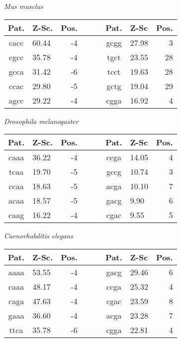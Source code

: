 \vspace{1em}
\noindent
{\it Mus musclus}

\noindent
\begin{center}
\begin{tabular}{clrcclr}
Pat. & Z-Sc. & Pos. & \verb+   + & Pat. & Z-Sc & Pos. \\
\hline
cacc & 60.44 & -4 & & gcgg & 27.98 & 3 \\
cgcc & 35.78 & -4 & & tgct & 23.55 & 28 \\
gcca & 31.42 & -6 & & tcct & 19.63 & 28 \\
ccac & 29.80 & -5 & & gctg & 19.04 & 29 \\
agcc & 29.22 & -4 & & cgga & 16.92 & 4 \\
\end{tabular}
\end{center}

\vspace{1em}
\noindent
{\it Drosophila melanogaster}

\noindent
\begin{center}
\begin{tabular}{clrcclr}
Pat. & Z-Sc. & Pos. & \verb+   + & Pat. & Z-Sc & Pos. \\
\hline
caaa & 36.22 & -4 & & ccga & 14.05 & 4 \\
tcaa & 19.70 & -5 & & gccg & 10.74 & 3 \\
ccaa & 18.63 & -5 & & acga & 10.10 & 7 \\
acaa & 18.57 & -5 & & gacg & 9.90 & 6 \\
caag & 16.22 & -4 & & cgac & 9.55 & 5 \\
\end{tabular}
\end{center}

\vspace{1em}
\noindent
{\it  Caenorhabditis elegans}

\noindent
\begin{center}
\begin{tabular}{clrcclr}
Pat. & Z-Sc. & Pos. & \verb+   + & Pat. & Z-Sc & Pos. \\
\hline
aaaa & 53.55 & -4 & & gacg & 29.46 & 6 \\
caaa & 48.17 & -4 & & ccga & 25.32 & 4 \\
caga & 47.63 & -4 & & cgac & 23.59 & 8 \\
gaaa & 36.60 & -4 & & acga & 23.28 & 7 \\
ttca & 35.78 & -6 & & cgga & 22.81 & 4 \\
\end{tabular}
\end{center}


